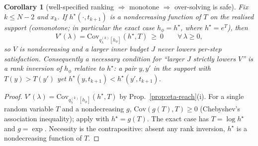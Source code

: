 \documentclass[11pt]{article}
\newcommand{\Cov}{\mathrm{Cov}}
\newcommand{\hs}{h^\star}
\theoremstyle{plain}
\newtheorem{corollary}{Corollary}
\theoremstyle{definition}
\theoremstyle{remark}
\begin{document}
\begin{corollary}[well-specified ranking $\Rightarrow$ monotone $\Rightarrow$ over-solving is safe]
\label{cor:comonotone}
Fix $k\le N-2$ and $x_k$. If $\hs(\cdot,t_{k+1})$ is a nondecreasing function of $T$ on the
realised support (\emph{comonotone}; in particular the exact case $h_\phi=\hs$, where
$\hs=e^{T}$), then
\[
V'(\lambda)=\Cov_{q^{(k)}_\lambda[h_\phi]}(\hs,T)\ \ge\ 0\qquad\forall\,\lambda\ge0,
\]
so $V$ is nondecreasing and a larger inner budget $J$ never lowers per-step satisfaction.
Consequently a \emph{necessary} condition for ``larger $J$ strictly lowers $V$'' is a rank
inversion of $h_\phi$ relative to $\hs$: a pair $y,y'$ in the support with $T(y)>T(y')$ yet
$\hs(y,t_{k+1})<\hs(y',t_{k+1})$.
\end{corollary}
\begin{proof}
$V'(\lambda)=\Cov_{q^{(k)}_\lambda[h_\phi]}(\hs,T)$ by Prop.~\ref{prop:eta-reach}(i). For a single
random variable $T$ and a nondecreasing $g$, $\Cov(g(T),T)\ge0$ (Chebyshev's association
inequality); apply with $\hs=g(T)$. The exact case has $T=\log\hs$ and $g=\exp$. Necessity is
the contrapositive: absent any rank inversion, $\hs$ is a nondecreasing function of $T$.
\end{proof}
\end{document}
